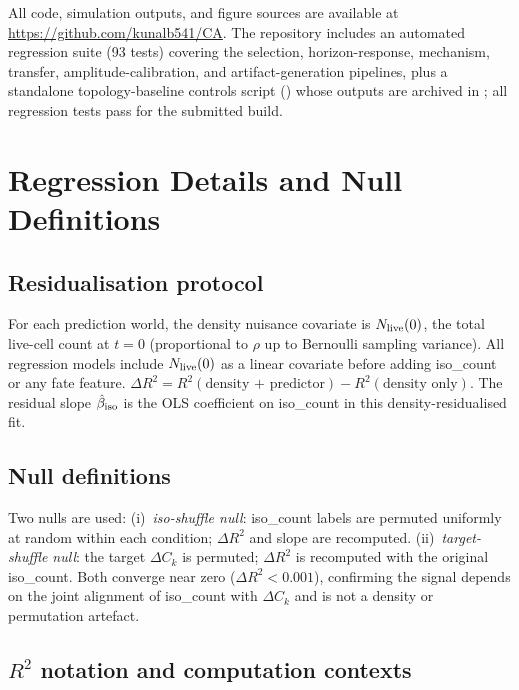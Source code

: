 \documentclass[aip,cha,preprint,nofootinbib]{revtex4-2}
\newcommand{\iso}{{\rm iso}}
\newcommand{\Ck}{\Delta C_k}
\newcommand{\biso}{\hat{\beta}_{\iso}}
\begin{document}
All code, simulation outputs, and figure sources are available at
\url{https://github.com/kunalb541/CA}.
The repository includes an automated regression suite (93 tests) covering
the selection, horizon-response, mechanism, transfer, amplitude-calibration,
and artifact-generation pipelines, plus a standalone topology-baseline
controls script () whose
outputs are archived in ;
all regression tests pass for the submitted build.

\appendix

\section{Regression Details and Null Definitions}
\label{app:residual}

\subsection*{Residualisation protocol}

For each prediction world, the density nuisance covariate is
$N_{\rm live}(0)$, the total live-cell count at $t=0$
(proportional to $\rho$ up to Bernoulli sampling variance).
All regression models include $N_{\rm live}(0)$ as a linear covariate
before adding iso\_count or any fate feature.
$\Delta R^2 = R^2(\text{density + predictor}) - R^2(\text{density only})$.
The residual slope $\biso$ is the OLS coefficient on iso\_count in this
density-residualised fit.

\subsection*{Null definitions}

Two nulls are used:
(i)~\emph{iso-shuffle null}: iso\_count labels are permuted uniformly at
random within each condition; $\Delta R^2$ and slope are recomputed.
(ii)~\emph{target-shuffle null}: the target $\Ck$ is permuted; $\Delta R^2$
is recomputed with the original iso\_count.
Both converge near zero ($\Delta R^2 < 0.001$), confirming the signal
depends on the joint alignment of iso\_count with $\Ck$ and is not
a density or permutation artefact.

\subsection*{$R^2$ notation and computation contexts}
\end{document}
